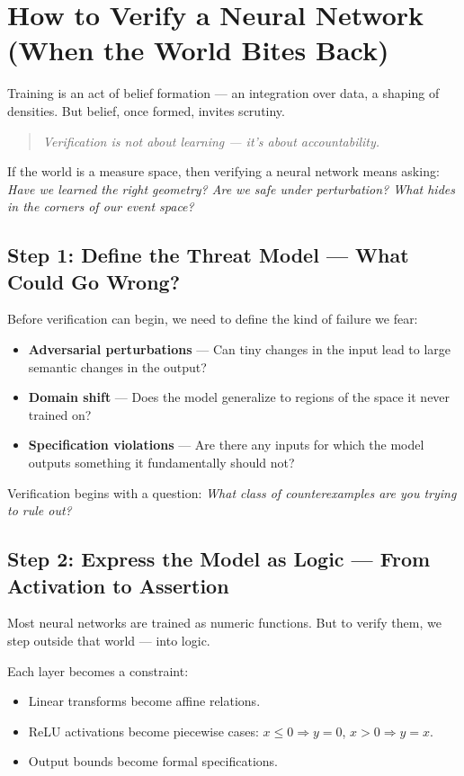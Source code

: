 \section{How to Verify a Neural Network (When the World Bites Back)}

Training is an act of belief formation — an integration over data, a shaping of densities. But belief, once formed, invites scrutiny.

\begin{quote}
\textit{Verification is not about learning — it’s about accountability.}
\end{quote}

If the world is a measure space, then verifying a neural network means asking:  
\textit{Have we learned the right geometry? Are we safe under perturbation? What hides in the corners of our event space?}

\subsection{Step 1: Define the Threat Model — What Could Go Wrong?}

Before verification can begin, we need to define the kind of failure we fear:

\begin{itemize}
  \item \textbf{Adversarial perturbations} — Can tiny changes in the input lead to large semantic changes in the output?
  \item \textbf{Domain shift} — Does the model generalize to regions of the space it never trained on?
  \item \textbf{Specification violations} — Are there any inputs for which the model outputs something it fundamentally should not?
\end{itemize}

Verification begins with a question:  
\textit{What class of counterexamples are you trying to rule out?}

\subsection{Step 2: Express the Model as Logic — From Activation to Assertion}

Most neural networks are trained as numeric functions. But to verify them, we step outside that world — into logic.

Each layer becomes a constraint:
\begin{itemize}
  \item Linear transforms become affine relations.
  \item ReLU activations become piecewise cases: \( x \leq 0 \Rightarrow y = 0 \), \( x > 0 \Rightarrow y = x \).
  \item Output bounds become formal specifications.
\end{itemize}


